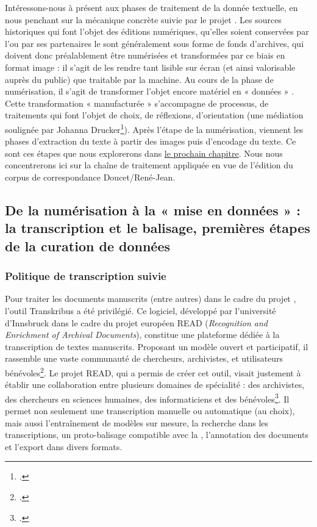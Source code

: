 Intéressons-nous à présent aux phases de traitement de la donnée textuelle, en nous penchant sur la mécanique concrète suivie par le projet \pense. Les sources historiques qui font l’objet des éditions numériques, qu’elles soient conservées par l’\inha ou par ses partenaires le sont généralement sous forme de fonds d’archives, qui doivent donc préalablement être numérisées et transformées par ce biais en format image : il s’agit de les rendre tant lisible sur écran (et ainsi valorisable auprès du public) que traitable par la machine. Au cours de la phase de numérisation, il s’agit de transformer l’objet encore matériel en « données » . Cette transformation « manufacturée » s’accompagne de processus, de traitements qui font l’objet de choix, de réflexions, d’orientation (une médiation soulignée par Johanna Drucker\footcite[p.8]{drucker_is_2013}). 
Après l’étape de la numérisation, viennent les phases d’extraction du texte à partir des images puis d’encodage du texte. Ce sont ces étapes que nous explorerons dans \hyperlink{chap3}{le prochain chapitre}. Nous nous concentrerons ici sur la chaîne de traitement appliquée en vue de l’édition du corpus de correspondance Doucet/René-Jean.

\subsection{De la numérisation à la « mise en données » : la transcription et le balisage, premières étapes de la curation de données}

\subsubsection{Politique de transcription suivie}


Pour traiter les documents manuscrits (entre autres) dans le cadre du projet \pense, l’outil Transkribus a été privilégié. Ce logiciel, développé par l’université d’Innsbruck dans le cadre du projet européen READ (\textit{Recognition and Enrichment of Archival Documents}), constitue une plateforme dédiée à la transcription de textes manuscrits. Proposant un modèle ouvert et participatif, il rassemble une vaste communauté de chercheurs, archivistes, et utilisateurs bénévoles\footcite{carius_plateforme_2020}. Le projet READ, qui a permis de créer cet outil, visait justement à établir une collaboration entre plusieurs domaines de spécialité : des archivistes, des chercheurs en sciences humaines, des informaticiens et des bénévoles\footcite{noauthor_recognition_2015}. Il permet non seulement une transcription manuelle ou automatique (au choix), mais aussi l’entraînement de modèles sur mesure, la recherche dans les transcriptions, un proto-balisage compatible avec la \tei,  l’annotation des documents et l'export dans divers formats. 

